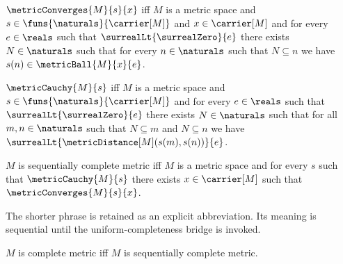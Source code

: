 \begin{definition}\label{metric_convergence}
    $\metricConverges{M}{s}{x}$ iff
        $M$ is a metric space and
        $s\in\funs{\naturals}{\carrier[M]}$ and
        $x\in\carrier[M]$ and
        for every $e\in\reals$ such that
            $\surrealLt{\surrealZero}{e}$ there exists $N\in\naturals$
            such that for every $n\in\naturals$ such that $N\subseteq n$
                we have $s(n)\in\metricBall{M}{x}{e}$.
\end{definition}

\begin{definition}\label{metric_cauchy_sequence}
    $\metricCauchy{M}{s}$ iff
        $M$ is a metric space and
        $s\in\funs{\naturals}{\carrier[M]}$ and
        for every $e\in\reals$ such that
            $\surrealLt{\surrealZero}{e}$ there exists $N\in\naturals$
            such that for all $m,n\in\naturals$ such that
                $N\subseteq m$ and $N\subseteq n$ we have
                $\surrealLt{\metricDistance[M](s(m),s(n))}{e}$.
\end{definition}

\begin{definition}\label{sequentially_complete_metric_space}
    $M$ is sequentially complete metric iff
        $M$ is a metric space and
        for every $s$ such that $\metricCauchy{M}{s}$ there exists
            $x\in\carrier[M]$ such that $\metricConverges{M}{s}{x}$.
\end{definition}

The shorter phrase is retained as an explicit abbreviation.  Its meaning is
sequential until the uniform-completeness bridge is invoked.

\begin{abbreviation}\label{complete_metric_space}
    $M$ is complete metric iff $M$ is sequentially complete metric.
\end{abbreviation}
